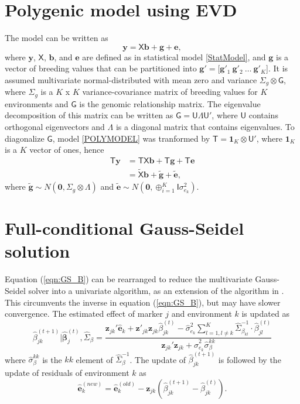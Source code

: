 \documentclass{bmcart}
\newcommand{\vecx}{\boldsymbol}
\newcommand{\mat}[1]{\boldsymbol{\mathsf{#1}}}
\begin{document}
\section{Polygenic model using EVD} \label{AppGblup}
The model can be written as 
\begin{equation}\label{POLYMODEL}
    \vecx{y} = \mat{X}\vecx{b} + \vecx{g} + \vecx{e},
\end{equation}
where $\vecx{y}$, $\mat{X}$, $\vecx{b}$, and $\vecx{e}$ are defined as in statistical model \ref{StatModel}, and $\vecx{g}$ is a vector of breeding values that can be partitioned into $\vecx{g}' = [\vecx{g}'_1 ~\vecx{g}'_2 ~\hdots ~\vecx{g}'_K$]. It is assumed multivariate normal-distributed with mean zero and variance $\mat{\Sigma}_g\otimes\mat{G}$, where $\mat{\Sigma}_g$ is a $K$ x $K$ variance-covariance matrix of breeding values for $K$ environments and $\mat{G}$ is the genomic relationship matrix. The eigenvalue decomposition of this matrix can be written as $\mat{G} = \mat{U}\mat{\Lambda}\mat{U}'$, where $\mat{U}$ contains orthogonal eigenvectors and $\mat{\Lambda}$ is a diagonal matrix that contains eigenvalues. To diagonalize $\mat{G}$, model \ref{POLYMODEL} was tranformed by $\mat{T} = \vecx{1}_K\otimes\mat{U}'$, where $\vecx{1}_K$ is a $K$ vector of ones, hence
\begin{align*}
    \mat{T}\vecx{y} &= \mat{T}\mat{X}\vecx{b} + \mat{T}\vecx{g} + \mat{T}\vecx{e}\\
     &= \tilde{\mat{X}}\vecx{b} + \tilde{\vecx{g}} + \tilde{\vecx{e}},
\end{align*}
where $\tilde{\vecx{g}}\sim N(\vecx{0}, \mat{\Sigma}_g\otimes\mat{\Lambda})$ and $\tilde{\vecx{e}}\sim N(\vecx{0}, \oplus^K_{i=1}\mat{I}\sigma^2_{e_k})$.

\section{Full-conditional Gauss-Seidel solution \label{UVMVsol}}

Equation (\ref{eqn:GS_B}) can be rearranged to reduce the multivariate Gauss-Seidel solver into a univariate algorithm, as an extension of the algorithm in \cite{GSRU}. This circumvents the inverse in equation (\ref{eqn:GS_B}), but may have slower convergence. The estimated effect of marker $j$ and environment $k$ is updated as
\begin{equation} \nonumber
\hat{\beta}^{(t+1)}_{jk}|\hat{\vecx{\beta}}^{(t)}_j,\hat{\mat{\Sigma}}_\beta = \frac{ \vecx{z}_{jk}'\hat{\vecx{e}}_k + \vecx{z}'_{jk}  \vecx{z}_{jk} \hat{\beta}_{jk}^{(t)} - \hat{\sigma}^{2}_{e_k}\sum^K_{l=1, l\ne k}\hat{\mat{\Sigma}}^{-1}_{\beta_{kl}}\cdot\hat{\beta}^{(t)}_{jl}}{ \vecx{z}_{jk} ' \vecx{z}_{jk} + \hat{\sigma}^2_{e_k}\hat{\sigma}_\beta^{kk} }
\end{equation}
where $\hat{\sigma}_\beta^{kk}$ is the $kk$ element of $\hat{\mat{\Sigma}}^{-1}_\beta$.
The update of $\hat{\beta}^{(t+1)}_{jk}$ is followed by the update of residuals of environment $k$ as
\begin{equation} \nonumber
\hat{\vecx{e}}^{(new)}_k = \hat{\vecx{e}}^{(old)}_k-\vecx{z}_{jk}(\hat{\beta}_{jk}^{(t+1)}-\hat{\beta}_{jk}^{(t)}).
\end{equation}
\end{document}
